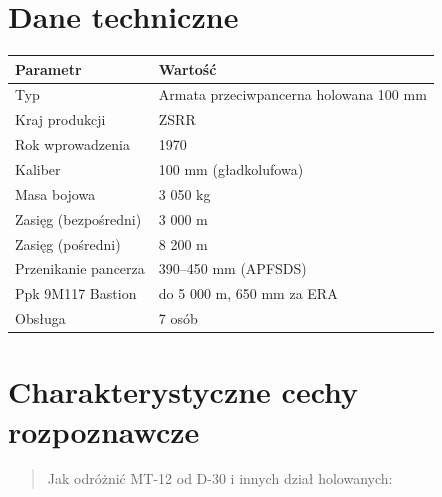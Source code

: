 \documentclass[12pt,openany,oneside]{book}
\begin{document}
\section{Dane techniczne}\label{dane-techniczne-23}

\begin{longtable}[]{@{}ll@{}}
\toprule\noalign{}
Parametr & Wartość \\
\midrule\noalign{}
\endhead
\bottomrule\noalign{}
\endlastfoot
Typ & Armata przeciwpancerna holowana 100 mm \\
Kraj produkcji & ZSRR \\
Rok wprowadzenia & 1970 \\
Kaliber & 100 mm (gładkolufowa) \\
Masa bojowa & 3 050 kg \\
Zasięg (bezpośredni) & 3 000 m \\
Zasięg (pośredni) & 8 200 m \\
Przenikanie pancerza & 390--450 mm (APFSDS) \\
Ppk 9M117 Bastion & do 5 000 m, 650 mm za ERA \\
Obsługa & 7 osób \\
\end{longtable}

\section{Charakterystyczne cechy
rozpoznawcze}\label{charakterystyczne-cechy-rozpoznawcze-23}

\begin{quote}
Jak odróżnić MT-12 od D-30 i innych dział holowanych:
\end{quote}
\end{document}
